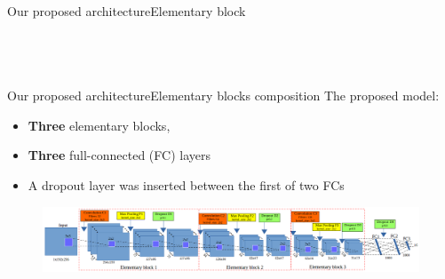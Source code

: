 \documentclass[10pt,svgnames]{beamer}
\begin{document}
\begin{frame}{Our proposed architecture}{Elementary block}
\begin{columns}
\begin{column}{0.55\textwidth}
{\begin{center}
\begin{figure}[htbp]
    				\label{figrsexample1}
				\end{figure}
     		\end{center}	
     		}				     		
		\end{column}
	\end{columns}~\\		
		
\end{frame}

\begin{frame}{Our proposed architecture}{Elementary blocks composition}
	The proposed model: 
		\small{
			\begin{itemize}
				\item \textbf{Three} elementary blocks,
    			\item \textbf{Three} full-connected (FC) layers
    			\item A dropout layer was inserted between the first of two FCs
  			\end{itemize}}
  		
    		\begin{center}
     			\begin{figure}[htbp]
        			\centering
        			\includegraphics[scale=.2]{images/arch_model}
				\end{figure}
     		\end{center}
\end{frame}
\end{document}
